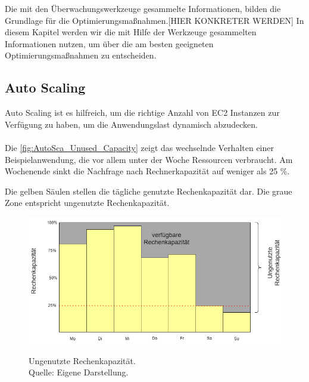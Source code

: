
Die mit den Überwachungswerkzeuge gesammelte Informationen, bilden die Grundlage für die Optimierungsmaßnahmen.[HIER KONKRETER WERDEN]
In diesem Kapitel werden wir die mit Hilfe der Werkzeuge gesammelten Informationen nutzen, um über die am besten geeigneten Optimierungsmaßnahmen zu entscheiden.

\subsection{Auto Scaling}%
Auto Scaling ist es hilfreich, um die richtige Anzahl von EC2 Instanzen zur Verfügung zu haben, um die Anwendungslast dynamisch abzudecken.
\\\\

Die \autoref{fig:AutoSca_Unused_Capacity} zeigt das wechselnde Verhalten einer Beispielanwendung, die vor allem unter der Woche Ressourcen verbraucht. Am Wochenende sinkt die Nachfrage nach Rechnerkapazität auf weniger als 25 \%. 

Die gelben Säulen stellen die tägliche genutzte Rechenkapazität dar.
Die graue Zone entspricht ungenutzte Rechenkapazität. 

\begin{figure}[h]
    \centering
    \includegraphics[scale=0.6]{sources/AutoCap Unused Capacity}
    \caption{}\label{fig:AutoSca_Unused_Capacity} Ungenutzte Rechenkapazität. \\
    Quelle: Eigene Darstellung. 
  \end{figure}

